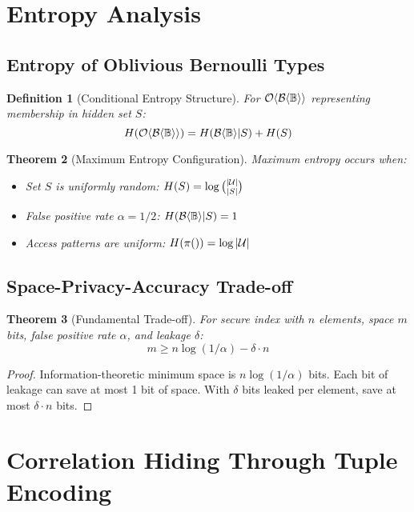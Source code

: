 \documentclass[11pt,final,hidelinks]{article}
\newcommand{\BernBool}{\mathcal{B}\langle \Bool \rangle}
\newcommand{\fprate}{\alpha}
\newtheorem{theorem}{Theorem}[section]
\newtheorem{definition}[theorem]{Definition}
\begin{document}
\section{Entropy Analysis}

\subsection{Entropy of Oblivious Bernoulli Types}

\begin{definition}[Conditional Entropy Structure]
For $\Obv{\BernBool}$ representing membership in hidden set $S$:
\begin{equation}
\Info{\Obv{\BernBool}} = \Info{\BernBool | S} + \Info{S}
\end{equation}
\end{definition}

\begin{theorem}[Maximum Entropy Configuration]
Maximum entropy occurs when:
\begin{itemize}
    \item Set $S$ is uniformly random: $H(S) = \log \binom{|\mathcal{U}|}{|S|}$
    \item False positive rate $\fprate = 1/2$: $\Info{\BernBool|S} = 1$
    \item Access patterns are uniform: $H(\pi()) = \log |\mathcal{U}|$
\end{itemize}
\end{theorem}

\subsection{Space-Privacy-Accuracy Trade-off}

\begin{theorem}[Fundamental Trade-off]
For secure index with $n$ elements, space $m$ bits, false positive rate $\fprate$, and leakage $\delta$:
\begin{equation}
m \geq n \log(1/\fprate) - \delta \cdot n
\end{equation}
\end{theorem}

\begin{proof}
Information-theoretic minimum space is $n\log(1/\fprate)$ bits.
Each bit of leakage can save at most 1 bit of space.
With $\delta$ bits leaked per element, save at most $\delta \cdot n$ bits.
\end{proof}

\section{Correlation Hiding Through Tuple Encoding}
\end{document}
